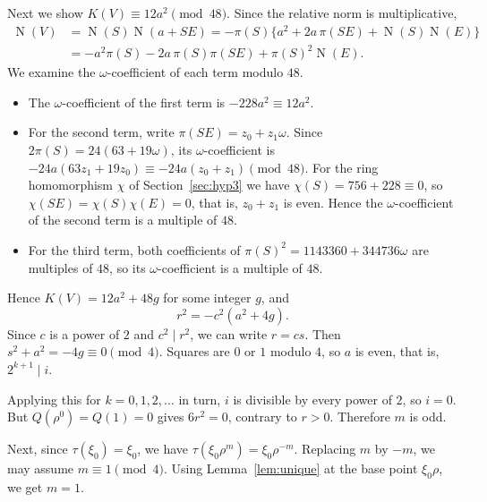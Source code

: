 \documentclass[a4paper,11pt]{article}
\theoremstyle{plain}
\theoremstyle{definition}
\theoremstyle{remark}
\numberwithin{equation}{section}
\numberwithin{table}{section}
\newcommand{\Nm}{\operatorname{N}}
\begin{document}
Next we show $K(V)\equiv12a^2\pmod{48}$. Since the relative norm is multiplicative,
\[
\begin{aligned}
\Nm(V)&=\Nm(S)\Nm(a+SE)=-\pi(S)\bigl\{a^2+2a\,\pi(SE)+\Nm(S)\Nm(E)\bigr\}\\
&=-a^2\pi(S)-2a\,\pi(S)\pi(SE)+\pi(S)^2\Nm(E).
\end{aligned}
\]
We examine the $\omega$-coefficient of each term modulo $48$.
\begin{itemize}
\item The $\omega$-coefficient of the first term is $-228a^2\equiv12a^2$.
\item For the second term, write $\pi(SE)=z_0+z_1\omega$. Since $2\pi(S)=24(63+19\omega)$, its $\omega$-coefficient is $-24a(63z_1+19z_0)\equiv-24a(z_0+z_1)\pmod{48}$. For the ring homomorphism $\chi$ of Section~\ref{sec:hyp3} we have $\chi(S)=756+228\equiv0$, so $\chi(SE)=\chi(S)\chi(E)=0$, that is, $z_0+z_1$ is even. Hence the $\omega$-coefficient of the second term is a multiple of $48$.
\item For the third term, both coefficients of $\pi(S)^2=1143360+344736\omega$ are multiples of $48$, so its $\omega$-coefficient is a multiple of $48$.
\end{itemize}
Hence $K(V)=12a^2+48g$ for some integer $g$, and
\[
r^2=-c^2(a^2+4g).
\]
Since $c$ is a power of $2$ and $c^2\mid r^2$, we can write $r=cs$. Then $s^2+a^2=-4g\equiv0\pmod4$. Squares are $0$ or $1$ modulo $4$, so $a$ is even, that is, $2^{k+1}\mid i$.

Applying this for $k=0,1,2,\dots$ in turn, $i$ is divisible by every power of $2$, so $i=0$. But $Q(\rho^0)=Q(1)=0$ gives $6r^2=0$, contrary to $r>0$.
Therefore $m$ is odd.

Next, since $\tau(\xi_0)=\xi_0$, we have $\tau(\xi_0\rho^m)=\xi_0\rho^{-m}$.
Replacing $m$ by $-m$, we may assume $m\equiv1\pmod4$.
Using Lemma~\ref{lem:unique} at the base point $\xi_0\rho$, we get $m=1$.
\end{document}
